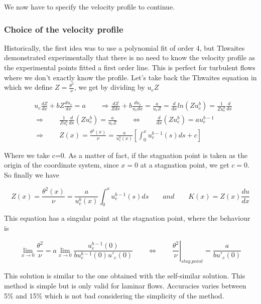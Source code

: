 We now have to specify the velocity profile to continue.

\subsubsection{Choice of the velocity profile}
Historically, the first idea was to use a polynomial fit of order 4, but Thwaites demonstrated experimentally that there is no need to know the velocity profile as the experimental points fitted a first order line. This is perfect for turbulent flows where we don't exactly know the profile. Let's take back the Thwaites equation in which we define $Z=\frac{\theta^2}{\nu}$, we get by dividing by $u_eZ$

\begin{equation} 
\begin{aligned}
&u_e\frac{d Z}{d x}+ bZ\frac{d u_e}{d x}=a \qquad \Rightarrow \frac{d Z}{Z d x}+b \frac{d u_e}{u_e d x}=\frac{a}{u_eZ}  = \frac{d }{d x} ln(Zu_e^b) = \frac{1}{Zu_e^b}\frac{d }{d x} \\
&\Rightarrow \qquad \frac{1}{Zu_e^b}\frac{d }{d x} (Zu_e^b)=\frac{a}{u_eZ} \qquad  \Leftrightarrow \qquad \frac{d }{d x} (Zu_e^b)=au_e^{b-1}\\
&\Rightarrow \qquad Z(x)=\frac{\theta^2(x)}{\nu}=\frac{a}{u_e^b(x)}\left[\int_0^x u_e^{b-1}(s) d s +c\right]
\end{aligned}
\end{equation}

Where we take c=0. As a matter of fact, if the stagnation point is taken as the origin of the coordinate system, since $x=0$ at a stagnation point, we get $c=0$. So finally we have

\begin{equation}
 Z(x)=\frac{\theta^2(x)}{\nu}=\frac{a}{u_e^b(x)}\int_0^x u_e^{b-1}(s) d s \qquad and \qquad K(x) = Z(x) \frac{du}{dx}
\end{equation}

This equation has a singular point at the stagnation point, where the behaviour is

\begin{equation}
\lim_{x \rightarrow 0} \frac{\theta^2}{\nu}=a \lim_{x \rightarrow 0} \frac{u_e^{b-1}(0)}{bu_e^{b-1}(0) u'_e(0)} \qquad\Leftrightarrow \qquad \left.\frac{\theta^2}{\nu}\right|_{stag.point}=\frac{a}{bu'_e(0)}
\end{equation}

This solution is similar to the one obtained with the self-similar solution.
This method is simple but is only valid for laminar flows. Accuracies varies between  5\%  and 15\% which is not bad considering the simplicity of the method.

